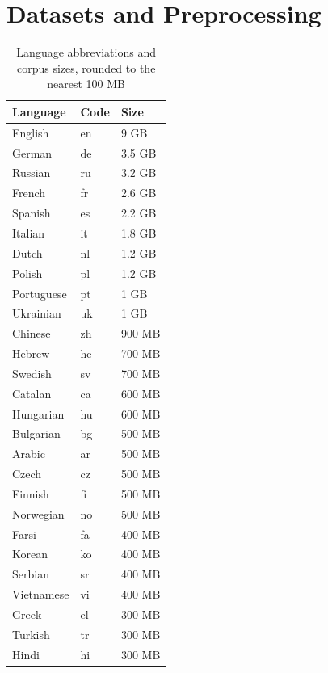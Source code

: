 \documentclass[11pt,a4paper,twoside,openright]{scrbook}
\begin{document}
\section{Datasets and Preprocessing}
\begin{table}
\centering
\caption{Language abbreviations and corpus sizes, rounded to the nearest 100 MB}
\label{table:sizes}
    \begin{tabular}{|l|l|l|}
        \hline
        Language   & Code & Size   \\ \hline
        English    & en   & 9 GB   \\ 
        German     & de   & 3.5 GB \\ 
        Russian    & ru   & 3.2 GB \\ 
        French     & fr   & 2.6 GB \\ 
        Spanish    & es   & 2.2 GB \\ 
        Italian    & it   & 1.8 GB \\ 
        Dutch      & nl   & 1.2 GB \\ 
        Polish     & pl   & 1.2 GB \\ 
        Portuguese & pt   & 1 GB   \\ 
        Ukrainian  & uk   & 1 GB   \\ 
        Chinese    & zh   & 900 MB \\ 
        Hebrew     & he   & 700 MB \\ 
        Swedish    & sv   & 700 MB \\ 
        Catalan    & ca   & 600 MB \\ 
        Hungarian  & hu   & 600 MB \\ 
        Bulgarian  & bg   & 500 MB \\ 
        Arabic     & ar   & 500 MB \\ 
        Czech      & cz   & 500 MB \\ 
        Finnish    & fi   & 500 MB \\ 
        Norwegian  & no   & 500 MB \\ 
        Farsi      & fa   & 400 MB \\ 
        Korean     & ko   & 400 MB \\ 
        Serbian    & sr   & 400 MB \\ 
        Vietnamese & vi   & 400 MB \\ 
        Greek      & el   & 300 MB \\ 
        Turkish    & tr   & 300 MB \\ 
        Hindi      & hi   & 300 MB \\ 

\end{tabular}
\end{table}
\end{document}
